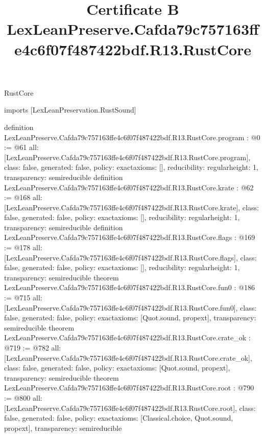 \begin{lexlean}{RustCore}
\title{Certificate B LexLeanPreserve.Cafda79c757163ffe4c6f07f487422bdf.R13.RustCore}
\begin{coremodule}
imports [LexLeanPreservation.RustSound]

definition LexLeanPreserve.Cafda79c757163ffe4c6f07f487422bdf.R13.RustCore.program : @0 := @61 {
  all: [LexLeanPreserve.Cafda79c757163ffe4c6f07f487422bdf.R13.RustCore.program],
  class: false,
  generated: false,
  policy: exact{axioms: []},
  reducibility: regular{height: 1},
  transparency: semireducible
}
definition LexLeanPreserve.Cafda79c757163ffe4c6f07f487422bdf.R13.RustCore.krate : @62 := @168 {
  all: [LexLeanPreserve.Cafda79c757163ffe4c6f07f487422bdf.R13.RustCore.krate],
  class: false,
  generated: false,
  policy: exact{axioms: []},
  reducibility: regular{height: 1},
  transparency: semireducible
}
definition LexLeanPreserve.Cafda79c757163ffe4c6f07f487422bdf.R13.RustCore.flags : @169 := @178 {
  all: [LexLeanPreserve.Cafda79c757163ffe4c6f07f487422bdf.R13.RustCore.flags],
  class: false,
  generated: false,
  policy: exact{axioms: []},
  reducibility: regular{height: 1},
  transparency: semireducible
}
theorem LexLeanPreserve.Cafda79c757163ffe4c6f07f487422bdf.R13.RustCore.fun0 : @186 := @715 {
  all: [LexLeanPreserve.Cafda79c757163ffe4c6f07f487422bdf.R13.RustCore.fun0],
  class: false,
  generated: false,
  policy: exact{axioms: [Quot.sound, propext]},
  transparency: semireducible
}
theorem LexLeanPreserve.Cafda79c757163ffe4c6f07f487422bdf.R13.RustCore.crate_ok : @719 := @782 {
  all: [LexLeanPreserve.Cafda79c757163ffe4c6f07f487422bdf.R13.RustCore.crate_ok],
  class: false,
  generated: false,
  policy: exact{axioms: [Quot.sound, propext]},
  transparency: semireducible
}
theorem LexLeanPreserve.Cafda79c757163ffe4c6f07f487422bdf.R13.RustCore.root : @790 := @800 {
  all: [LexLeanPreserve.Cafda79c757163ffe4c6f07f487422bdf.R13.RustCore.root],
  class: false,
  generated: false,
  policy: exact{axioms: [Classical.choice, Quot.sound, propext]},
  transparency: semireducible
}


\end{coremodule}
\end{lexlean}
